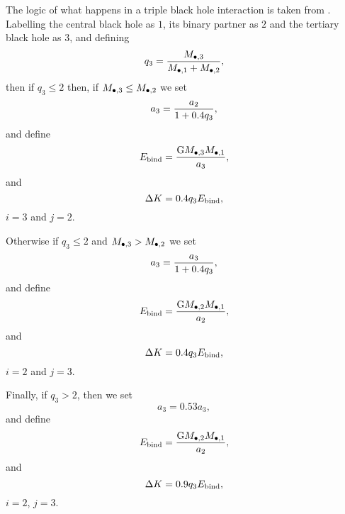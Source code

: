 The logic of what happens in a triple black hole interaction is taken from \cite{volonteri_assembly_2003}. Labelling the central black hole as $1$, its binary partner as $2$ and the tertiary black hole as $3$, and defining
\begin{equation}
q_3 = {M_{\bullet, 3} \over M_{\bullet, 1} + M_{\rm \bullet, 2} },
\end{equation}
then if $q_3 \le 2$ then, if $M_{\bullet, 3} \le M_{\rm \bullet, 2}$ we set
\begin{equation}
a_3 = {a_2 \over 1 + 0.4 q_3}, 
\end{equation}
and define
\begin{equation}
E_{\rm bind} = {{\rm G} M_{\bullet, 3} M_{\bullet, 1} \over a_3},
\end{equation}
and
\begin{equation}
\Delta K =0.4 q_3 E_{\rm bind},
\end{equation}
$i=3$ and $j=2$. 

Otherwise if $q_3 \le 2$ and $M_{\bullet, 3} > M_{\rm \bullet, 2}$ we set
\begin{equation}
a_3 = { a_3 \over 1 +0.4 q_3},
\end{equation}
and define
\begin{equation}
E_{\rm bind} = {{\rm G} M_{\bullet, 2} M_{\bullet, 1} \over a_2},
\end{equation}
and
\begin{equation}
 \Delta K =0.4 q_3 E_{\rm bind},
\end{equation}
$i=2$ and $j=3$.

Finally, if $q_3 > 2$, then we set
\begin{equation}
a_3 =0.53 a_3,
\end{equation}
and define
\begin{equation}
E_{\rm bind} = {{\rm G} M_{\bullet, 2} M_{\bullet, 1} \over a_2},
\end{equation}
and
\begin{equation}
\Delta K =0.9 q_3 E_{\rm bind},
\end{equation}
$i=2$, $j=3$.

